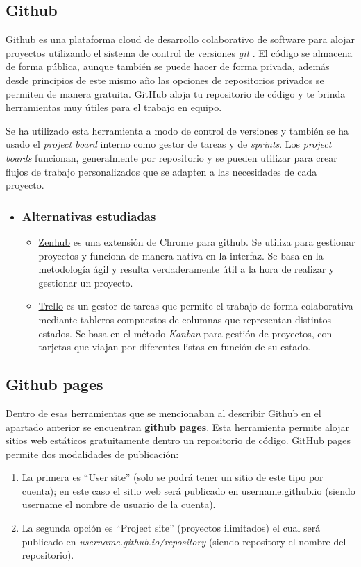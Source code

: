  \subsection{Github}
\href{https://github.com/}{Github} es una plataforma cloud de desarrollo colaborativo de software para alojar proyectos utilizando el sistema de control de versiones \textit{git} \cite{git_2019}. El código se almacena de forma pública, aunque también se puede hacer de forma privada, además desde principios de este mismo año las opciones de repositorios privados se permiten de manera gratuita.  GitHub aloja tu repositorio de código y te brinda herramientas muy útiles para el trabajo en equipo. 

Se ha utilizado esta herramienta a modo de control de versiones y también se ha usado el \textit{project board} interno como gestor de tareas y de \textit{sprints}. Los \textit{project boards} funcionan, generalmente por repositorio y se pueden utilizar para crear flujos de trabajo personalizados que se adapten a las necesidades de cada proyecto.

\begin{itemize}
	\item \subsubsection{Alternativas estudiadas}
	\begin{itemize}
		\item \href{https://www.zenhub.io/}{Zenhub} es una extensión de Chrome para github. Se utiliza para gestionar proyectos y funciona de manera nativa en la interfaz. Se basa en la metodología ágil y resulta verdaderamente útil a la hora de realizar y gestionar un proyecto.
		\item \href{https://www.trello.com/}{Trello} es un gestor de tareas que permite el trabajo de forma colaborativa mediante tableros compuestos de columnas  que representan distintos estados. Se basa en el método \textit{Kanban} para gestión de proyectos, con tarjetas que viajan por diferentes listas en función de su estado. 
	\end{itemize}
\end{itemize}

\subsection{Github pages}
Dentro de esas herramientas que se mencionaban al describir Github en el apartado anterior se encuentran \textbf{github pages}. Esta herramienta permite alojar sitios web estáticos gratuitamente dentro un repositorio de código. GitHub pages permite dos modalidades de publicación:
\begin{enumerate}
	\item La primera es “User site” (solo se podrá tener un sitio de este tipo por cuenta); en este caso el sitio web será publicado en username.github.io (siendo username el nombre de usuario de la cuenta).
	\item La segunda opción es “Project site” (proyectos ilimitados) el cual será publicado en \textit{username.github.io/repository} (siendo repository el nombre del repositorio).
\end{enumerate}

